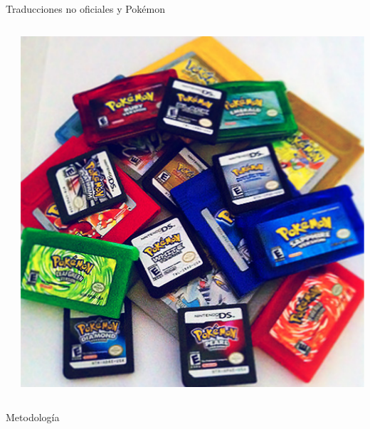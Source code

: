 \begin{frame}{Traducciones no oficiales y Pokémon}
\begin{columns}
\begin{column}{0.6\textwidth}
  \end{column}

  \begin{column}{0.4\textwidth}
    \includegraphics[width=\textwidth]{imgs/pokemon_cart.pdf}
  \end{column}
\end{columns}

\end{frame}


\begin{frame}{Metodología}

\end{frame}

